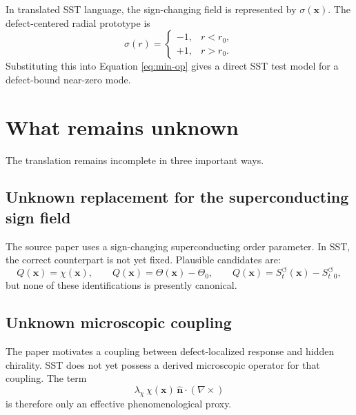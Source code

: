 \documentclass[11pt]{article}
\newcommand{\SwirlClock}{S_t^{\boldsymbol{\circlearrowleft}}}
\begin{document}
        In translated SST language, the sign-changing field is represented by $\sigma(\mathbf{x})$. The defect-centered radial prototype is
        \begin{equation}
            \sigma(r)=
            \begin{cases}
                -1, & r<r_0,\\
                +1, & r>r_0.
            \end{cases}
        \end{equation}
        Substituting this into Equation \eqref{eq:min-op} gives a direct SST test model for a defect-bound near-zero mode.

    \section{What remains unknown}
        The translation remains incomplete in three important ways.

        \subsection{Unknown replacement for the superconducting sign field}
            The source paper uses a sign-changing superconducting order parameter. In SST, the correct counterpart is not yet fixed. Plausible candidates are:
            \begin{equation}
                Q(\mathbf{x}) = \chi(\mathbf{x}),
                \qquad
                Q(\mathbf{x}) = \Theta(\mathbf{x})-\Theta_0,
                \qquad
                Q(\mathbf{x}) = \SwirlClock(\mathbf{x})-\SwirlClock_0,
            \end{equation}
            but none of these identifications is presently canonical.

        \subsection{Unknown microscopic coupling}
            The paper motivates a coupling between defect-localized response and hidden chirality. SST does not yet possess a derived microscopic operator for that coupling. The term
            \begin{equation}
                \lambda_\chi \, \chi(\mathbf{x})\, \hat{\mathbf{n}}\cdot(\nabla\times)
            \end{equation}
            is therefore only an effective phenomenological proxy.
\end{document}
